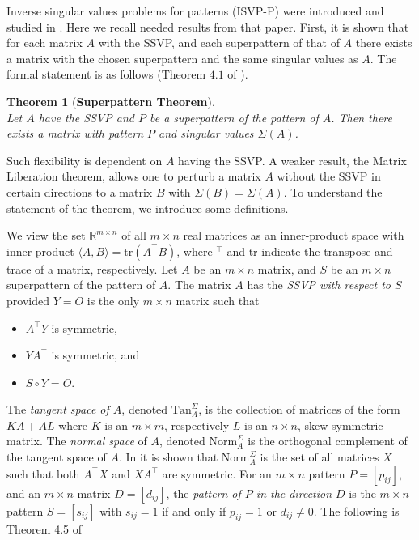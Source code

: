 \documentclass[preprint,12pt]{elsarticle}
\newcommand{\trans  }{^\top}
\newtheorem{theorem}{Theorem}[section]
\begin{document}
 Inverse singular values problems for patterns (ISVP-P) were introduced and studied
in \cite{cheung2025strongsingularvalueproperty}.
Here we recall  needed results from that paper. 
First, it is shown that for each matrix $A$ with the SSVP, and each superpattern 
of that of $A$ there exists  a matrix with the chosen superpattern and the same singular values
as $A$. The formal statement is as follows
(Theorem $4.1$ of
\cite{cheung2025strongsingularvalueproperty}).

\begin{theorem}[\bf Superpattern Theorem]

\label{superpattern}
\phantom{ } \\
    Let $A$ have the SSVP and $P$ be a superpattern of the pattern of $A$. Then there exists a matrix
    with pattern $P$ and singular values $\Sigma(A)$. 
\end{theorem}


Such flexibility is dependent on $A$ having the SSVP. A weaker result, the Matrix Liberation theorem, allows one to perturb a matrix $A$ without the SSVP in certain directions to a matrix $B$ with  
$\Sigma(B) = \Sigma(A)$.
To understand the statement of the theorem, we introduce some definitions.

We view the set $\mathbb{R}^{m\times n}$ of all $m\times n$ real matrices as an inner-product space with inner-product $\langle A, B \rangle= \mbox{tr}(A\trans B)$, where $\trans$ and $\mbox{tr}$ indicate the transpose and trace of a matrix, respectively. Let $A$ be an $m\times n$ matrix, and $S$ be an $m\times n$ superpattern of the pattern of $A$. The matrix $A$ has the {\it SSVP with respect to $S$} provided $Y=O$ is the only $m\times n$ matrix such that 
\begin{itemize}
\item[(a)]
$A\trans Y$ is symmetric,
\item[(b)]
$YA\trans$
is symmetric, and 
\item[(c)] $S \circ Y=O$.
\end{itemize} 
The \textit{tangent space of $A$}, denoted $\mbox{Tan}^{\Sigma}_A$, is the collection of matrices of the form 
$KA+AL$ where $K$ is an $m\times m$, respectively $L$ is an $n\times n$, skew-symmetric matrix. The \textit{normal space} of $A$, denoted $\mbox{Norm}^{\Sigma}_A$ is the orthogonal complement of the tangent space of $A$. In 
\cite{cheung2025strongsingularvalueproperty} it is shown that 
$\mbox{Norm}^{\Sigma}_A$ is the set of all matrices $X$ such that 
both $A\trans X$ and $XA\trans$ are symmetric. For an $m\times n$ pattern $P=[p_{ij}]$,  and an $m\times n$ matrix
$D=[d_{ij}]$,
the {\it pattern of $P$ in the direction $D$} is the $m\times n$ 
pattern $S=[s_{ij}]$ with $s_{ij}=1$ if and only if  $p_{ij}=1$ or $d_{ij}\neq 0$.
The following is Theorem 4.5 of 
\cite{cheung2025strongsingularvalueproperty}
\end{document}
